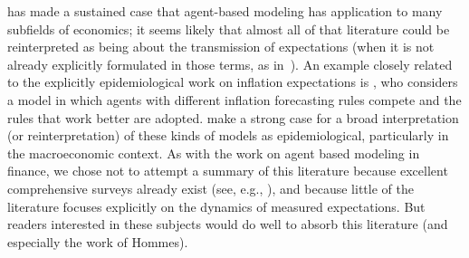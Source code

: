 \cite{tesfatsion2006agent} has made a sustained case that agent-based modeling has application to many subfields of economics; it seems likely that almost all of that literature could be reinterpreted as being about the transmission of expectations (when it is not already explicitly formulated in those terms, as in~\cite{hommes2006heterogeneous}).  An example closely related to the explicitly epidemiological work on inflation expectations is \cite{branchHeteroExp}, who considers a model in which agents with different inflation forecasting rules compete and the rules that work better are adopted.  \cite{haldane_drawing_2019} make a strong case for a broad interpretation (or reinterpretation) of these kinds of models as epidemiological, particularly in the macroeconomic context.  As with the work on agent based modeling in finance, we chose not to attempt a summary of this literature because excellent comprehensive surveys already exist (see, e.g., \cite{ddAgentBasedMacro}), and because little of the literature focuses explicitly on the dynamics of measured expectations.  But readers interested in these subjects would do well to absorb this literature (and especially the work of Hommes).

